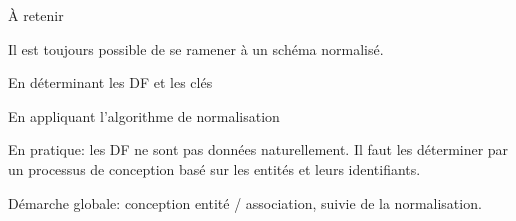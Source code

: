 \begin{frame}{À retenir}

Il est \alert{toujours} possible de se ramener à un schéma normalisé.

\vfill
\begin{redbullet}
   \item En déterminant les DF et les clés
   \item En appliquant l'algorithme de normalisation
\end{redbullet}

\vfill

\alert{En pratique}: les DF ne sont pas données naturellement. Il faut les déterminer
par un processus de conception basé sur les entités et leurs identifiants.

\vfill
\begin{blocgauche}
\alert{Démarche globale}: conception entité / association,
suivie de la normalisation.
\end{blocgauche}
\end{frame}

